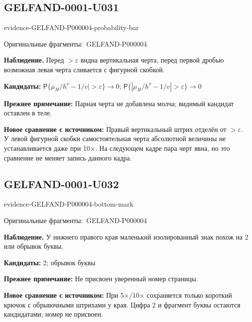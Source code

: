 \documentclass[11pt]{article}
\newcommand{\EvidenceBlock}[4]{%
 \par\smallskip\noindent\begin{minipage}{\linewidth}
 \begin{minipage}[t]{.47\linewidth}\vspace{0pt}\centering
 \csname evidence-#1-#2\endcsname\par
 {\scriptsize\SourceCropCaption\ #1}\par
 \end{minipage}\hfill
 \begin{minipage}[t]{.49\linewidth}\vspace{0pt}\raggedright
 {\small\color{orange!65!black}\textbf{#4} #3}\par
 \end{minipage}
 \end{minipage}\par\smallskip}
\newcommand{\SourceCropCaption}{Оригинальные фрагменты:}\newcommand{\ReadingCaption}{Сомнительное чтение.}\newcommand{\IncompleteCaption}{Неразобранный фрагмент.}\newcommand{\DiagramCaption}{Рисунок и набранное описание.}
\begin{document}
\subsection*{GELFAND-0001-U031}
\EvidenceBlock{GELFAND-P000004}{probability-bar}{Перед \(>\varepsilon\) видна вертикальная черта, перед первой дробью возможная левая черта сливается с фигурной скобкой.}{Наблюдение.}
\par\smallskip\noindent\textbf{Кандидаты: } \(\mathsf P\{\mu_H/h^\nu-1/v\mid>\varepsilon\}\to0\); \(\mathsf P\{|\mu_H/h^\nu-1/v|>\varepsilon\}\to0\)\par
\par\smallskip\noindent\textbf{Прежнее примечание: } Парная черта не добавлена молча; видимый кандидат оставлен в теле.\par
\par\smallskip\noindent\textbf{Новое сравнение с источником: } Правый вертикальный штрих отделён от \(>\varepsilon\). У левой фигурной скобки самостоятельная черта абсолютной величины не устанавливается даже при 10×. На следующем кадре пара черт явна, но это сравнение не меняет запись данного кадра.\par

\subsection*{GELFAND-0001-U032}
\EvidenceBlock{GELFAND-P000004}{bottom-mark}{У нижнего правого края маленький изолированный знак похож на 2 или обрывок буквы.}{Наблюдение.}
\par\smallskip\noindent\textbf{Кандидаты: } 2; обрывок буквы\par
\par\smallskip\noindent\textbf{Прежнее примечание: } Не присвоен уверенный номер страницы.\par
\par\smallskip\noindent\textbf{Новое сравнение с источником: } При 5×/10× сохраняется только короткий крючок с обрывочными штрихами у края. Цифра 2 и фрагмент буквы остаются кандидатами; номер не присвоен.\par
\end{document}
